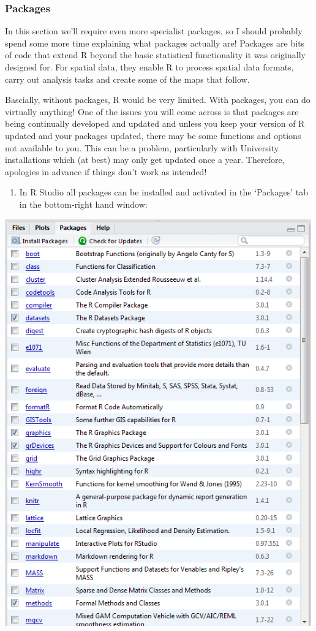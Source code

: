 \documentclass[]{book}
\providecommand{\tightlist}{%
  \setlength{\itemsep}{0pt}\setlength{\parskip}{0pt}}
\begin{document}
\hypertarget{packages}{%
\subsubsection{Packages}\label{packages}}

In this section we'll require even more specialist packages, so I should probably spend some more time explaining what packages actually are! Packages are bits of code that extend R beyond the basic statistical functionality it was originally designed for. For spatial data, they enable R to process spatial data formats, carry out analysis tasks and create some of the maps that follow.

Bascially, without packages, R would be very limited. With packages, you can do virtually anything! One of the issues you will come across is that packages are being continually developed and updated and unless you keep your version of R updated and your packages updated, there may be some functions and options not available to you. This can be a problem, particularly with University installations which (at best) may only get updated once a year. Therefore, apologies in advance if things don't work as intended!

\begin{enumerate}
\def\labelenumi{\arabic{enumi}.}
\tightlist
\item
  In R Studio all packages can be installed and activated in the `Packages' tab in the bottom-right hand window:
\end{enumerate}

\begin{center}\includegraphics[width=500px]{prac2_images/r_packages} \end{center}
\end{document}
